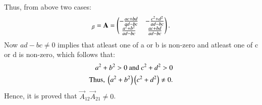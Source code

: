 Thus, from above two cases:
\begin{align}
    [\vec{T}]_\beta = \vec{A} = \myvec{-\frac{ac+bd}{ad-bc} & -\frac{c^2+d^2}{ad-bc} \\ \frac{a^2+b^2}{ad-bc} & \frac{ac+bd}{ad-bc}}.
\end{align}
Now $ad-bc \neq 0$ implies that atleast one of a or b is non-zero and atleast one of c or d is non-zero, which follows that:
\begin{align}
    a^2 + b^2 > 0 \text{ and } c^2 + d^2 > 0 \\
    \text{Thus, } \left(a^2+b^2\right)\left(c^2+d^2\right) \neq 0.
\end{align}
Hence, it is proved that $\vec{A}_{12}\vec{A}_{21} \neq 0$.

